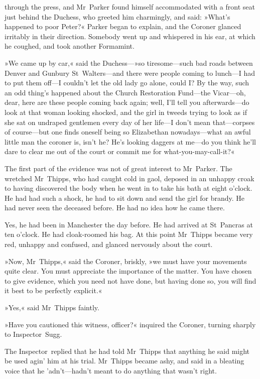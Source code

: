 through the press, and Mr~Parker found himself accommodated with a front seat just behind the Duchess, who greeted him charmingly, and said: »What's happened to poor Peter?« Parker began to explain, and the Coroner glanced irritably in their direction. Somebody went up and whispered in his ear, at which he coughed, and took another Formamint.

»We came up by car,« said the Duchess---»so tiresome—such bad roads between Denver and Gunbury St~Walters—and there were people coming to lunch—I had to put them off—I couldn't let the old lady go alone, could I\@? By the way, such an odd thing's happened about the Church Restoration Fund—the Vicar—oh, dear, here are these people coming back again; well, I'll tell you afterwards—do look at that woman looking shocked, and the girl in tweeds trying to look as if she sat on undraped gentlemen every day of her life—I don't mean that—corpses of course—but one finds oneself being so Elizabethan nowadays—what an awful little man the coroner is, isn't he? He's looking daggers at me—do you think he'll dare to clear me out of the court or commit me for what-you-may-call-it?«

The first part of the evidence was not of great interest to Mr~Parker. The wretched Mr~Thipps, who had caught cold in gaol, deposed in an unhappy croak to having discovered the body when he went in to take his bath at eight o'clock. He had had such a shock, he had to sit down and send the girl for brandy. He had never seen the deceased before. He had no idea how he came there.

Yes, he had been in Manchester the day before. He had arrived at St~Pancras at ten o'clock. He had cloak-roomed his bag. At this point Mr~Thipps became very red, unhappy and confused, and glanced nervously about the court.

»Now, Mr~Thipps,« said the Coroner, briskly, »we must have your movements quite clear. You must appreciate the importance of the matter. You have chosen to give evidence, which you need not have done, but having done so, you will find it best to be perfectly explicit.«

»Yes,« said Mr~Thipps faintly.

»Have you cautioned this witness, officer?« inquired the Coroner, turning sharply to Inspector~Sugg.

The Inspector~replied that he had told Mr~Thipps that anything he said might be used agin' him at his trial. Mr~Thipps became ashy, and said in a bleating voice that he 'adn't—hadn't meant to do anything that wasn't right.

